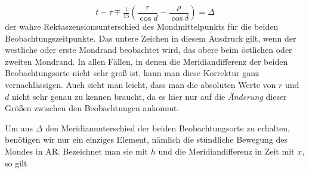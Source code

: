 \[
t-\tau \mp \tfrac{1}{15}\left(\frac{r}{\cos d}-\frac{\rho}{\cos\delta}\right) = \Delta
\]
\noindent der wahre Rektaszensionsunterschied des Mondmittelpunkts für die beiden Beobachtungszeitpunkte. Das untere Zeichen in diesem Ausdruck gilt, wenn der westliche oder erste Mondrand beobachtet wird, das obere beim östlichen oder zweiten Mondrand. In allen Fällen, in denen die Meridiandifferenz der beiden Beobachtungsorte nicht sehr groß ist, kann man diese Korrektur ganz vernachlässigen. Auch
%
sieht man leicht, dass man die absoluten Werte von $r$ und $d$ nicht sehr genau zu kennen braucht, da es hier nur auf die \emph{Änderung} dieser Größen zwischen den Beobachtungen ankommt.

Um aus $\Delta$ den Meridianunterschied der beiden Beobachtungsorte zu erhalten, benötigen wir nur ein einziges Element, nämlich die stündliche Bewegung des Mondes in AR. Bezeichnet man sie mit $h$ und die Meridiandifferenz in Zeit mit $x$, so gilt

